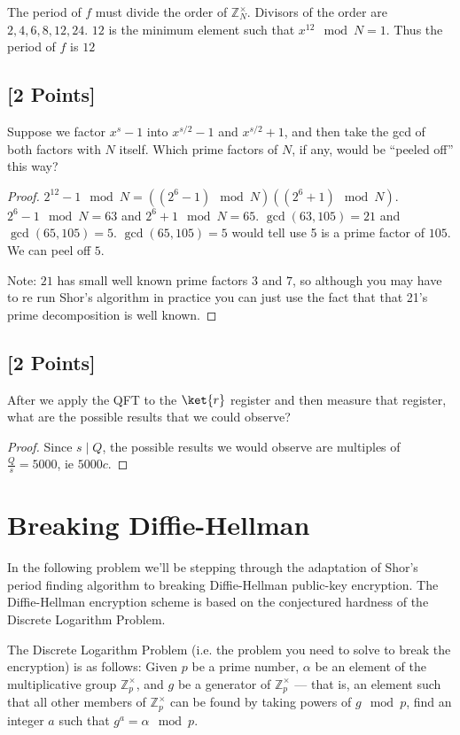 \documentclass[11pt]{article}
\newcommand{\Z}{\mathbb{Z}}
\begin{document}
\begin{solution}
    The period of $f$ must divide the order of $\Z^\times_N$. Divisors of the order are $2, 4, 6, 8, 12, 24$. $12$ is the minimum element such that $x^{12} \mod N = 1$. Thus the period of $f$ is $12$  
\end{solution}

\subsection{[2 Points]} Suppose we factor $x^s-1$ into $x^{s/2}-1$ and $x^{s/2}+1$, and then take the gcd of both factors with $N$ itself.  Which prime factors of $N$, if any, would be ``peeled off'' this way?

\begin{proof}
    $2^{12} - 1 \mod N = ((2^{6} - 1) \mod N)((2^{6} + 1) \mod N)$. $2^{6} - 1 \mod N = 63$ and $2^{6} + 1 \mod N = 65$. $\gcd(63, 105) = 21$ and $\gcd(65, 105) = 5$. $\gcd(65, 105) = 5$ would tell use 5 is a prime factor of $105$. We can peel off $5$. 
    
    Note: $21$ has small well known prime factors $3$ and $7$, so although you may have to re run Shor's algorithm in practice you can just use the fact that that 21's prime decomposition is well known.    
\end{proof}

\subsection{[2 Points]} After we apply the QFT to the $\ket{r}$ register and then measure that register, what are the possible results that we could observe?
\begin{proof}
    Since $s \mid Q$, the possible results we would observe are multiples of $\frac{Q}{s} = 5000$, ie $5000c$.    
\end{proof}




\section{Breaking Diffie-Hellman}
In the following problem we'll be stepping through the adaptation of Shor's period finding algorithm to breaking Diffie-Hellman public-key encryption. The Diffie-Hellman encryption scheme is based on the conjectured hardness of the Discrete Logarithm Problem. 

The Discrete Logarithm Problem (i.e. the problem you need to solve to break the encryption) is as follows: Given $p$ be a prime number, $\alpha$ be an element of the multiplicative group $\mathbb{Z}_p^\times$, and $g$ be a generator of $\mathbb{Z}_p^\times$ --- that is, an element such that all other members of $\mathbb{Z}_p^\times$ can be found by taking powers of $g \mod p$, find an integer $a$ such that $g^a= \alpha \mod p$.
\end{document}
